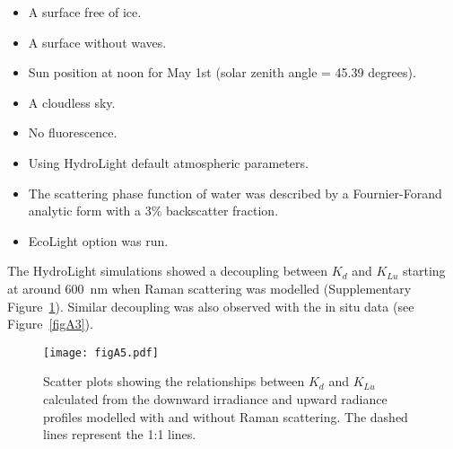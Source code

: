 \documentclass[applsci,article,accept,moreauthors,pdftex,10pt,a4paper]{Definitions/mdpi}
\newcommand{\ked}{\ensuremath{K_{d}}}
\newcommand{\klu}{\ensuremath{K_{Lu}}}
\begin{document}
\begin{itemize}
	\item A surface free of ice.
	\item A surface without waves.
	\item Sun position at noon for May 1st (solar zenith angle = 45.39 degrees).
	\item A cloudless sky.
	\item No fluorescence.
	\item Using HydroLight default atmospheric parameters.
	\item The scattering phase function of water was described by a Fournier-Forand analytic form with a 3\% backscatter fraction.
	\item EcoLight option was run.
\end{itemize}

The HydroLight simulations showed a decoupling between \ked{} and \klu{} starting at around 600~nm when Raman scattering was modelled (Supplementary Figure~\ref{figA5}). Similar decoupling was also observed with the in situ data (see  Figure~\ref{figA3}).

\begin{figure}[H]
	\centering
	\texttt{[image: figA5.pdf]}
	\caption{Scatter plots showing the relationships between \ked{} and \klu{} calculated from the downward irradiance and upward radiance profiles modelled with and without Raman scattering. The dashed lines represent the 1:1 lines.}\label{figA5}
\end{figure}

\end{document}
